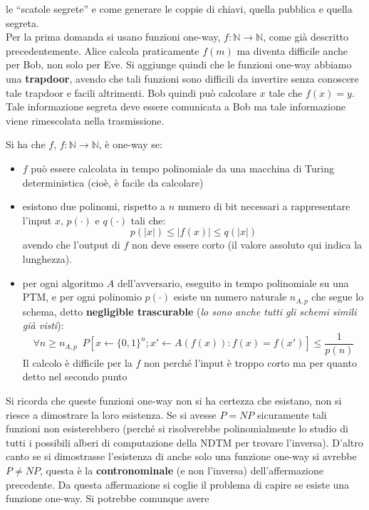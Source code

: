 \documentclass[a4paper,12pt, oneside]{book}
\begin{document}
le ``scatole segrete'' e
come generare le coppie di chiavi, quella pubblica e quella segreta.\\
Per la prima domanda si usano funzioni one-way, $f:\mathbb{N}\to\mathbb{N}$,
come già descritto precedentemente. Alice calcola praticamente $f(m)$ ma diventa
difficile anche per Bob, non solo per Eve. Si aggiunge quindi che le funzioni
one-way abbiamo una \textbf{trapdoor}, avendo che tali funzioni sono difficili
da invertire senza conoscere tale trapdoor e facili altrimenti. Bob quindi può
calcolare $x$ tale che $f(x)=y$. Tale informazione segreta deve essere
comunicata a Bob ma tale informazione viene rimescolata nella trasmissione.
\begin{definizione}
  Si ha che $f$, $f:\mathbb{N}\to\mathbb{N}$, è one-way se:
  \begin{itemize}
    \item $f$ può essere calcolata in tempo polinomiale da una macchina di
    Turing deterministica (cioè, è facile da calcolare)  
    \item esistono due polinomi, rispetto a $n$ numero di bit necessari a
    rappresentare l'input $x$, $p(\cdot)$ e $q(\cdot)$ tali che:
    \[p(|x|)\leq |f(x)|\leq q(|x|)\]
    avendo che l'output di $f$ non deve essere corto (il valore assoluto qui
    indica la lunghezza). 
    \item per ogni algoritmo $A$ dell'avversario, eseguito in tempo polinomiale
    su una PTM, e per ogni polinomio $p(\cdot)$ esiste un numero naturale
    $n_{A,p}$ che segue lo schema, detto \textbf{negligible trascurable}
    (\textit{lo sono anche tutti gli schemi simili già visti}):
    \[\forall n\geq n_{A,p}\,\,\,P[x\gets\{0,1\}^n; x'\gets A(f(x)):
      f(x)=f(x')]\leq \frac{1}{p(n)}\]
    Il calcolo è difficile per la $f$ non perché l'input è troppo corto ma per
    quanto detto nel secondo punto
  \end{itemize}
\end{definizione}
Si ricorda che queste funzioni one-way non si ha certezza che esistano, non si
riesce a dimostrare la loro esistenza. Se si avesse $P=NP$ sicuramente tali
funzioni non esisterebbero (perché si risolverebbe polinomialmente lo studio di
tutti i possibili alberi di computazione della NDTM per trovare
l'inversa). D'altro canto se si dimostrasse l'esistenza di anche 
solo una funzione one-way si avrebbe $P\neq NP$, questa è la
\textbf{contronominale} (e non l'inversa) dell'affermazione precedente. Da
questa affermazione si coglie il problema di capire se esiste una funzione
one-way. Si potrebbe comunque avere 
\end{document}
